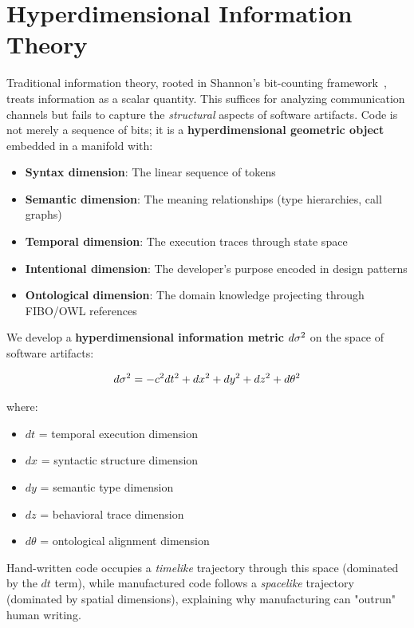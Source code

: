 \section{Hyperdimensional Information Theory}

Traditional information theory, rooted in Shannon's bit-counting framework~\cite{shannon1948mathematical}, treats information as a scalar quantity. This suffices for analyzing communication channels but fails to capture the \textit{structural} aspects of software artifacts. Code is not merely a sequence of bits; it is a \textbf{hyperdimensional geometric object} embedded in a manifold with:

\begin{itemize}
    \item \textbf{Syntax dimension}: The linear sequence of tokens
    \item \textbf{Semantic dimension}: The meaning relationships (type hierarchies, call graphs)
    \item \textbf{Temporal dimension}: The execution traces through state space
    \item \textbf{Intentional dimension}: The developer's purpose encoded in design patterns
    \item \textbf{Ontological dimension}: The domain knowledge projecting through FIBO/OWL references
\end{itemize}

We develop a \textbf{hyperdimensional information metric} $d\sigma^2$ on the space of software artifacts:

\begin{equation}
d\sigma^2 = -c^2 dt^2 + dx^2 + dy^2 + dz^2 + d\theta^2
\end{equation}

where:
\begin{itemize}
    \item $dt$ = temporal execution dimension
    \item $dx$ = syntactic structure dimension
    \item $dy$ = semantic type dimension
    \item $dz$ = behavioral trace dimension
    \item $d\theta$ = ontological alignment dimension
\end{itemize}

Hand-written code occupies a \textit{timelike} trajectory through this space (dominated by the $dt$ term), while manufactured code follows a \textit{spacelike} trajectory (dominated by spatial dimensions), explaining why manufacturing can "outrun" human writing.

